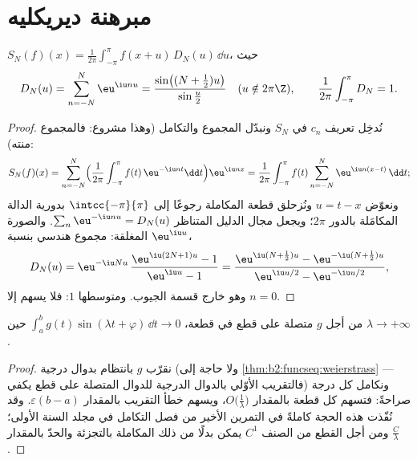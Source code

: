 \section{مبرهنة ديريكليه}

\begin{lemma}\label{lem:b2:fourier:kernel}
$S_N(f)(x) = \frac{1}{2\pi}\int_{-\pi}^{\pi} f(x + u)\,D_N(u)\,\dd
u$، حيث
\[
D_N(u) = \sum_{n=-N}^{N} \eu^{\iu nu}
= \frac{\sin\bigl((N + \frac12)u\bigr)}{\sin\frac u2}
\quad (u \notin 2\pi\Z),
\qquad
\frac{1}{2\pi}\int_{-\pi}^{\pi} D_N = 1 .
\]
\end{lemma}

\begin{proof}
نُدخِل تعريف $c_n$ في $S_N$ ونبدّل المجموع والتكامل
(وهذا مشروع: فالمجموع منته):
\[
S_N(f)(x)
= \sum_{n=-N}^{N}\Bigl(\frac{1}{2\pi}\int_{-\pi}^{\pi}
f(t)\,\eu^{-\iu nt}\dd t\Bigr)\eu^{\iu nx}
= \frac{1}{2\pi}\int_{-\pi}^{\pi} f(t)
\sum_{n=-N}^{N}\eu^{\iu n(x-t)}\,\dd t ;
\]
ونعوّض $u = t - x$ ونُزحلق قطعة المكاملة رجوعًا
إلى $\intcc{-\pi}{\pi}$ بدورية الدالة المكامَلة بالدور $2\pi$؛
ويجعل مجال الدليل المتناظر $\sum_n\eu^{-\iu nu} = D_N(u)$.
والصورة المغلقة: مجموع هندسي بنسبة $\eu^{\iu u}$،
\[
D_N(u) = \eu^{-\iu Nu}\,\frac{\eu^{\iu(2N+1)u} - 1}{\eu^{\iu u} -
1}
= \frac{\eu^{\iu(N + \frac12)u} - \eu^{-\iu(N+\frac12)u}}
{\eu^{\iu u/2} - \eu^{-\iu u/2}} ,
\]
وهو خارج قسمة الجيوب. ومتوسطها $1$: فلا يسهم إلا $n = 0$.
\end{proof}

\begin{theorem}\label{thm:b2:fourier:riemannlebesgue}
من أجل $g$ متصلة على قطع في قطعة،
$\int_a^b g(t)\sin(\lambda t + \varphi)\,\dd t \to 0$ حين $\lambda
\to +\infty$.
\end{theorem}

\begin{proof}
نقرّب $g$ بانتظام بدوال درجية
(ولا حاجة إلى \cref{thm:b2:funcseq:weierstrass} --- فالتقريب الأوّلي
بالدوال الدرجية للدوال المتصلة على قطع
يكفي) ونكامل كل درجة صراحةً: فتسهم كل قطعة
بالمقدار $O\bigl(\frac1\lambda\bigr)$، ويسهم خطأ التقريب
بالمقدار $\varepsilon(b - a)$. وقد نُفّذت هذه الحجة كاملةً
في التمرين الأخير من فصل التكامل في مجلد
السنة الأولى؛ ومن أجل القطع من الصنف $C^1$ يمكن بدلًا من ذلك المكاملة بالتجزئة
والحدّ بالمقدار $\frac C\lambda$.
\end{proof}

